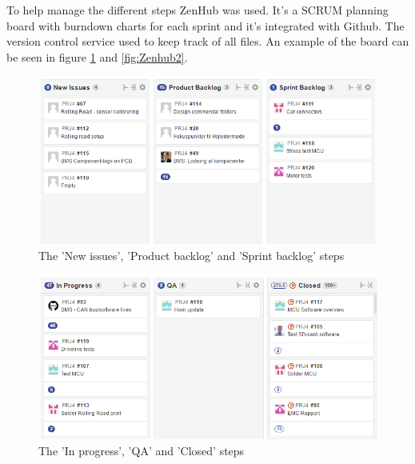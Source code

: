 To help manage the different steps ZenHub\cite{Zenhub} was used. It's a SCRUM planning board with burndown charts for each sprint and it's integrated with Github\cite{Github}. The version control service used to keep track of all files. An example of the board can be seen in figure \ref{fig:Zenhub1} and \vref{fig:Zenhub2}.

\begin{figure}
	\centering
	\includegraphics[width=0.7\linewidth]{SubPages/Images/Zenhub1}
	\caption{The 'New issues', 'Product backlog' and 'Sprint backlog' steps}
	\label{fig:Zenhub1}
\end{figure}

\begin{figure}
	\centering
	\includegraphics[width=0.7\linewidth]{SubPages/Images/Zenhub2}
	\caption{The 'In progress', 'QA' and 'Closed' steps}
	\label{fig:Zenhub2}
\end{figure}
